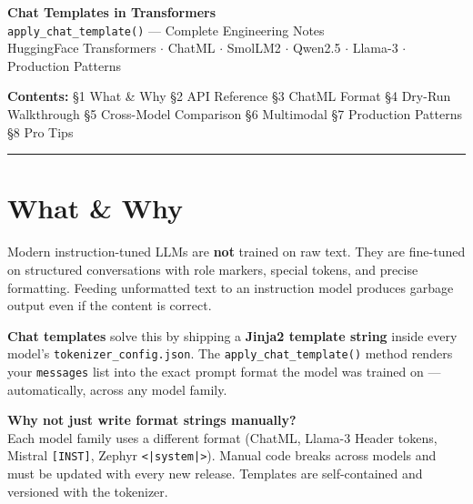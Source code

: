 \documentclass[11pt,a4paper]{article}
\newcommand{\api}[1]{\texttt{\color{teal}#1}}
\begin{document}
\begin{tcolorbox}[
  colback=headerBg, colframe=headerBg,
  coltext=white, arc=6pt,
  left=16pt, right=16pt, top=12pt, bottom=12pt
]
  {\LARGE\bfseries Chat Templates in Transformers}\\[6pt]
  {\large\color{lightBlue} \texttt{apply\_chat\_template()} --- Complete Engineering Notes}\\[4pt]
  {\small\color{borderGray} HuggingFace Transformers $\cdot$ ChatML $\cdot$ SmolLM2 $\cdot$ Qwen2.5 $\cdot$ Llama-3 $\cdot$ Production Patterns}
\end{tcolorbox}

\vspace{6pt}

{\small\color{mutedText}
\textbf{Contents:}
\S1 What \& Why \quad
\S2 API Reference \quad
\S3 ChatML Format \quad
\S4 Dry-Run Walkthrough \quad
\S5 Cross-Model Comparison \quad
\S6 Multimodal \quad
\S7 Production Patterns \quad
\S8 Pro Tips
}

\vspace{4pt}
\noindent\color{borderGray}\rule{\linewidth}{0.4pt}
\vspace{2pt}

\section{What \& Why}

Modern instruction-tuned LLMs are \textbf{not} trained on raw text. They are fine-tuned on structured conversations with role markers, special tokens, and precise formatting. Feeding unformatted text to an instruction model produces garbage output even if the content is correct.

\textbf{Chat templates} solve this by shipping a \textbf{Jinja2 template string} inside every model's \texttt{tokenizer\_config.json}. The \api{apply\_chat\_template()} method renders your \texttt{messages} list into the exact prompt format the model was trained on --- automatically, across any model family.

\begin{tcolorbox}[defbox]
  \textbf{Why not just write format strings manually?}\\
  Each model family uses a different format (ChatML, Llama-3 Header tokens, Mistral \texttt{[INST]}, Zephyr \texttt{<|system|>}). Manual code breaks across models and must be updated with every new release. Templates are self-contained and versioned with the tokenizer.
\end{tcolorbox}
\end{document}
